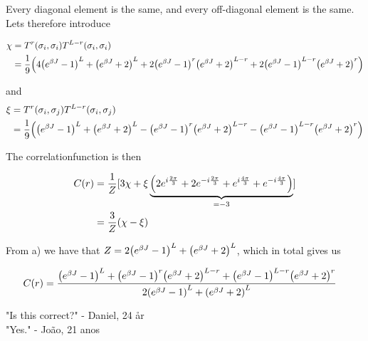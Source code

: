 \documentclass[12pt]{article}
\begin{document}
Every diagonal element is the same, and every off-diagonal element is the same.
Lets therefore introduce

\begin{align*}
    \chi &= T^r(\sigma_i, \sigma_i)T^{L-r}(\sigma_i,
    \sigma_i)\\ 
    &= \frac{1}{9}\qty(4\qty(e^{\beta J}-1)^L + \qty(e^{\beta J}+2)^L + 2\qty(e^{\beta
J}-1)^r\qty(e^{\beta J}+2)^{L-r} + 2\qty(e^{\beta J}-1)^{L-r}\qty(e^{\beta
J}+2)^r)
\end{align*}

and 
\begin{align*}
    \xi &= T^r(\sigma_i, \sigma_j)T^{L-r}(\sigma_i, \sigma_j)\\
    &=\frac{1}{9}\qty(\qty(e^{\beta J}-1)^L + \qty(e^{\beta J}+2)^L-
    \qty(e^{\beta J}-1)^r\qty(e^{\beta J}+2)^{L-r} - \qty(e^{\beta
    J}-1)^{L-r}\qty(e^{\beta J}+2)^r)
\end{align*}

The correlationfunction is then

\begin{align*}
    C(r) &= \frac{1}{Z}[3\chi + \xi\underbrace{\qty(2e^{i\frac{2\pi}{3}} + 2e^{-i\frac{2\pi}{3}} +
    e^{i\frac{4\pi}{3}} + e^{-i\frac{4\pi}{3}})}_{= -3}] \\
    &= \frac{3}{Z}\qty(\chi - \xi)
\end{align*}

From a) we have that $Z = 2\qty(e^{\beta J}-1)^L + \qty(e^{\beta J}+2)^L$, which
in total gives us

\begin{align*}
    C(r) &= \frac{\qty(e^{\beta J}-1)^L + \qty(e^{\beta J}-1)^r\qty(e^{\beta
    J}+2)^{L-r} + \qty(e^{\beta J}-1)^{L-r}\qty(e^{\beta J}+2)^r}{2\qty(e^{\beta J}-1)^L + \qty(e^{\beta J}+2)^L}
\end{align*}

"Is this correct?" - Daniel, 24 år \\
"Yes."  - João, 21 anos
\end{document}
